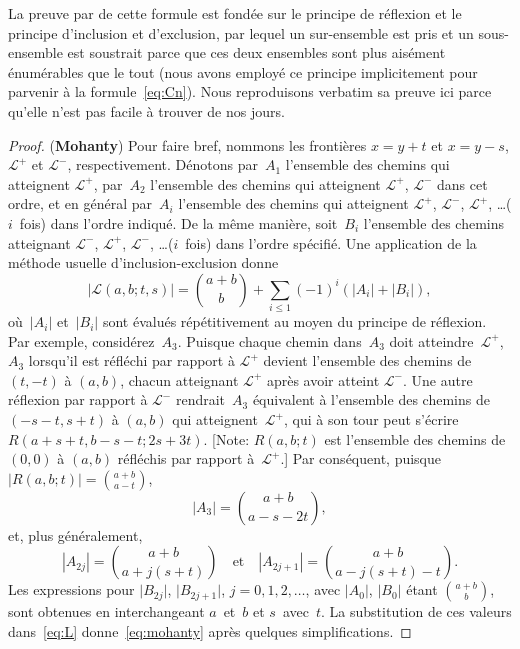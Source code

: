 La preuve par \citet[p.~6]{Mohanty_1979} de cette formule est fondée
sur le principe de réflexion et le principe d'inclusion et
d'exclusion, par lequel un sur-ensemble est pris et un sous-ensemble
est soustrait parce que ces deux ensembles sont plus aisément
énumérables que le tout (nous avons employé ce principe implicitement
pour parvenir à la formule~\eqref{eq:Cn}). Nous reproduisons verbatim
sa preuve ici parce qu'elle n'est pas facile à trouver de nos jours.
\begin{proof}
  (\textbf{Mohanty}) Pour faire bref, nommons les frontières \(x=y+t\)
  et \(x=y-s\), \(\mathcal{L}^{+}\) et \(\mathcal{L}^{-}\),
  respectivement. Dénotons par~\(A_1\) l'ensemble des chemins qui
  atteignent \(\mathcal{L}^{+}\), par~\(A_2\) l'ensemble des chemins
  qui atteignent \(\mathcal{L}^{+}\), \(\mathcal{L}^{-}\) dans cet
  ordre, et en général par~\(A_i\) l'ensemble des chemins qui
  atteignent \(\mathcal{L}^{+}\), \(\mathcal{L}^{-}\),
  \(\mathcal{L}^{+}\), \ldots (\(i\)~fois) dans l'ordre indiqué. De la
  même manière, soit~\(B_i\) l'ensemble des chemins atteignant
  \(\mathcal{L}^{-}\), \(\mathcal{L}^{+}\), \(\mathcal{L}^{-}\),
  \ldots (\(i\)~fois) dans l'ordre spécifié. Une application de la
  méthode usuelle d'inclusion\--exclusion donne
  \begin{equation}
    \left\lvert\mathcal{L}(a,b;t,s)\right\rvert = \binom{a+b}{b} +
    \sum_{i \leqslant 1}(-1)^{i}(\lvert{A_i}\rvert +
    \lvert{B_i}\rvert),\label{eq:L}
  \end{equation}
  où~\(\lvert{A_i}\rvert\) et~\(\lvert{B_i}\rvert\) sont évalués
  répétitivement au moyen du principe de réflexion. Par exemple,
  considérez~\(A_3\). Puisque chaque chemin dans~\(A_3\) doit
  atteindre~\(\mathcal{L}^{+}\), \(A_3\) lorsqu'il est réfléchi par
  rapport à \(\mathcal{L}^{+}\) devient l'ensemble des chemins de
  \((t,-t)\) à \((a,b)\), chacun atteignant \(\mathcal{L}^{+}\) après
  avoir atteint \(\mathcal{L}^{-}\). Une autre réflexion par rapport à
  \(\mathcal{L}^{-}\) rendrait~\(A_3\) équivalent à l'ensemble des
  chemins de \((-s-t,s+t)\) à \((a,b)\) qui
  atteignent~\(\mathcal{L}^{+}\), qui à son tour peut s'écrire
  \(R(a+s+t,b-s-t; 2s+3t)\). [Note: \(R(a,b;t)\) est l'ensemble des
    chemins de \((0,0)\) à \((a,b)\) réfléchis par rapport
    à~\(\mathcal{L}^{+}\).] Par conséquent, puisque
  \(\lvert{R(a,b;t)}\rvert = \binom{a+b}{a-t}\),
  \begin{equation*}
    \left\lvert{A_3}\right\rvert = \binom{a+b}{a-s-2t},
  \end{equation*}
  et, plus généralement,
  \begin{equation*}
    \left\lvert{A_{2j}}\right\rvert = \binom{a+b}{a+j(s+t)}
    \quad\text{et}\quad \left\lvert{A_{2j+1}}\right\rvert =
    \binom{a+b}{a-j(s+t)-t}.
  \end{equation*}
  Les expressions pour \(\lvert{B_{2j}}\rvert\),
  \(\lvert{B_{2j+1}}\rvert\), \(j=0, 1, 2, \dots\), avec
  \(\lvert{A_0}\rvert\), \(\lvert{B_0}\rvert\) étant
  \(\binom{a+b}{b}\), sont obtenues en interchangeant \(a\)~et~\(b\)
  et \(s\)~avec~\(t\). La substitution de ces valeurs
  dans~\eqref{eq:L} donne~\eqref{eq:mohanty} après quelques
  simplifications.
\end{proof}

